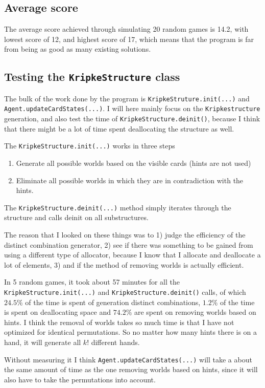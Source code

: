 \subsection{Average score}
The average score achieved through simulating 20 random games is 14.2, with lowest score of 12, and highest score of 17, which means that the program is far from being as good as many existing solutions.

\subsection{Testing the {\tt KripkeStructure} class} \label{sec:testing-kripkestructure-class}
The bulk of the work done by the program is {\tt KripkeStruture.init(...)} and {\tt Agent.updateCardStates(...)}.
I will here mainly focus on the {\tt Kripkestructure} generation, and also test the time of {\tt KripkeStructure.deinit()}, because I think that there might be a lot of time spent deallocating the structure as well.

The {\tt KripkeStructure.init(...)} works in three steps
\begin{enumerate}
	\item Generate all possible worlds based on the visible cards (hints are not used)
	\item Eliminate all possible worlds in which they are in contradiction with the hints.
\end{enumerate}

The {\tt KripkeStructure.deinit(...)} method simply iterates through the structure and calls deinit on all substructures.

The reason that I looked on these things was to 1) judge the efficiency of the distinct combination generator, 2) see if there was something to be gained from using a different type of allocator, because I know that I allocate and deallocate a lot of elements, 3) and if the method of removing worlds is actually efficient.

In 5 random games, it took about 57 minutes for all the {\tt KripkeStructure.init(...)} and {\tt KripkeStructure.deinit()} calls,
of which $24.5\%$ of the time is spent of generation distinct combinations, $1.2\%$ of the time is spent on deallocating space and $74.2\%$ are spent on removing worlds based on hints.
I think the removal of worlds takes so much time is that I have not optimized for identical permutations.
So no matter how many hints there is on a hand, it will generate all $k!$ different hands.

Without measuring it I think {\tt Agent.updateCardStates(...)} will take a about the same amount of time as the one removing worlds based on hints, since it will also have to take the permutations into account.



